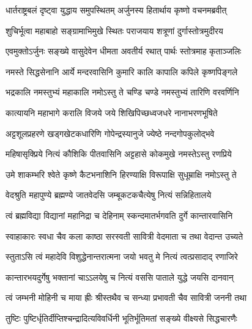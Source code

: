 


\twolineshloka
{धार्तराष्ट्रबलं दृष्ट्वा युद्धाय समुपस्थितम्}
{अर्जुनस्य हितार्थाय कृष्णो वचनमब्रवीत्}


\twolineshloka
{शुचिर्भूत्वा महाबाहो सङ्ग्रामाभिमुखे स्थितः}
{पराजयाय शत्रूणां दुर्गास्तोत्रमुदीरय}


\twolineshloka
{एवमुक्तोऽर्जुनः सङ्ख्ये वासुदेवेन धीमता}
{अवतीर्य रथात् पार्थः स्तोत्रमाह कृताञ्जलिः}


\twolineshloka
{नमस्ते सिद्धसेनानि आर्ये मन्दरवासिनि}
{कुमारि कालि कापालि कपिले कृष्णपिङ्गले}

\twolineshloka
{भद्रकालि नमस्तुभ्यं महाकालि नमोऽस्तु ते}
{चण्डि चण्डे नमस्तुभ्यं तारिणि वरवर्णिनि}

\twolineshloka
{कात्यायनि महाभागे करालि विजये जये}
{शिखिपिच्छध्वजधरे नानाभरणभूषिते}

\twolineshloka
{अट्टशूलप्रहरणे खड्गखेटकधारिणि}
{गोपेन्द्रस्यानुजे ज्येष्ठे नन्दगोपकुलोद्भवे}

\twolineshloka
{महिषासृक्प्रिये नित्यं कौशिकि पीतवासिनि}
{अट्टहासे कोकमुखे नमस्तेऽस्तु रणप्रिये}

\twolineshloka
{उमे शाकम्भरि श्वेते कृष्णे कैटभनाशिनि}
{हिरण्याक्षि विरूपाक्षि सुधूम्राक्षि नमोऽस्तु ते}

\twolineshloka
{वेदश्रुति महापुण्ये ब्रह्मण्ये जातवेदसि}
{जम्बूकटकचैत्येषु नित्यं सन्निहितालये}

\twolineshloka
{त्वं ब्रह्मविद्या विद्यानां महानिद्रा च देहिनाम्}
{स्कन्दमातर्भगवति दुर्गे कान्तारवासिनि}

\twolineshloka
{स्वाहाकारः स्वधा चैव कला काष्ठा सरस्वती}
{सावित्री वेदमाता च तथा वेदान्त उच्यते}

\twolineshloka
{स्तुताऽसि त्वं महादेवि विशुद्धेनान्तरात्मना}
{जयो भवतु मे नित्यं त्वत्प्रसादाद् रणाजिरे}

\twolineshloka
{कान्तारभयदुर्गेषु भक्तानां चाऽऽलयेषु च}
{नित्यं वससि पाताले युद्धे जयसि दानवान्}

\twolineshloka
{त्वं जम्भनी मोहिनी च माया ह्रीः श्रीस्तथैव च}
{सन्ध्या प्रभावती चैव सावित्री जननी तथा}

\twolineshloka
{तुष्टिः पुष्टिर्धृतिर्दीप्तिश्चन्द्रादित्यविवर्धिनी}
{भूतिर्भूतिमतां सङ्ख्ये वीक्ष्यसे सिद्धचारणैः}

